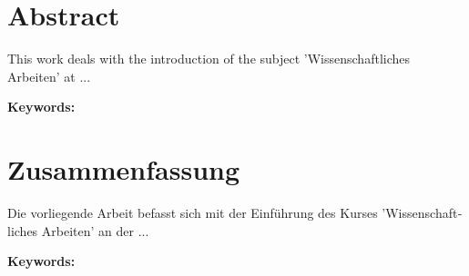 \documentclass[
  headexclude,
  footexclude,
  10pt,
  a4paper,
  oneside,
  captions=tableheading,
  bibliography=totoc,
  listof=totoc
]{scrbook}
\newenvironment{bibhyphenation}
{\hyphenpenalty=20
  \tolerance=9999
  \exhyphenpenalty=0
  \linepenalty=0
  \setlength{\emergencystretch}{3em}}
{}
\begin{document}
\chapter*{Abstract}

This work deals with the introduction of the subject 'Wissenschaftliches Arbeiten' at ...

\vspace{2cm}

\textbf{Keywords:} \campusKeywords

\chapter*{Zusammenfassung}

\begin{otherlanguage}{austrian}
Die vorliegende Arbeit befasst sich mit der Einführung des Kurses 'Wissenschaftliches Arbeiten' an der ...
\end{otherlanguage}

\vspace{2cm}

\textbf{Keywords:} \campusKeywords

\mainmatter

\setcounter{page}{1}

\pagestyle{scrheadings}
\setlength{\parindent}{0em}
\renewcommand*{\chapterpagestyle}{scrheadings}

\tableofcontents

\clearpage

\setcounter{page}{1}







\nocite{*}

\clearpage

\printbibheading[heading=bibintoc, title=References]
\begin{bibhyphenation}
  \printbibliography[heading=subbibintoc, title=Bibliography, filter={printed}]
  \printbibliography[heading=subbibintoc, title=Webography, filter={online}]
\end{bibhyphenation}

\clearpage

\ihead[]{\leftmark}
\listoffigures
\listoftables
\printglossary[type=\acronymtype]
\end{document}
